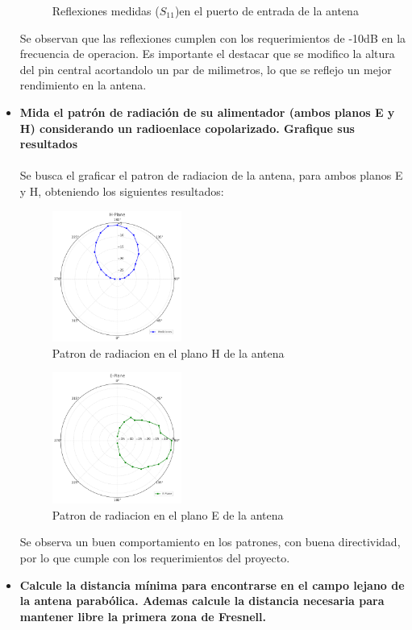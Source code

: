 \begin{itemize}
\begin{figure}
			\caption{Reflexiones medidas ($S_{11}$)en el puerto de entrada de la antena}
		\end{figure}
		Se observan que las reflexiones cumplen con los requerimientos de -10dB en la frecuencia de operacion. Es importante el destacar que se modifico la altura del pin central acortandolo un par de milimetros, lo que se reflejo un mejor rendimiento en la antena.
		\newpage
		\item \textbf{Mida el patrón de radiación de su alimentador (ambos planos E y H) considerando un radioenlace copolarizado. Grafique sus resultados}\\\\
		Se busca el graficar el patron de radiacion de la antena, para ambos planos E y H, obteniendo los siguientes resultados:
		\begin{figure}
			\centering
			\includegraphics[width=0.4\textwidth]{img/ejemplos/Figure_10}
			\caption{Patron de radiacion en el plano H de la antena}
		\end{figure}
		\begin{figure}
			\centering
			\includegraphics[width=0.4\textwidth]{img/ejemplos/Figure_11}
			\caption{Patron de radiacion en el plano E de la antena}
		\end{figure}
		Se observa un buen comportamiento en los patrones, con buena directividad, por lo que cumple con los requerimientos del proyecto.
		\newpage
		\item \textbf{Calcule la distancia mínima para encontrarse en el campo lejano de la antena parabólica. Ademas calcule la distancia necesaria para mantener libre la primera zona de Fresnell.}\\\\

\end{itemize}
